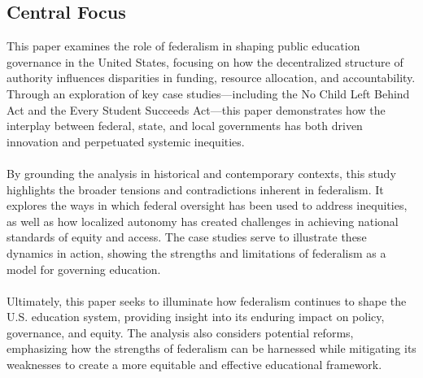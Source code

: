 \documentclass[11pt]{extarticle}
\begin{document}
\subsection{Central Focus}
This paper examines the role of federalism in shaping public education governance in the United States, focusing on how the decentralized structure of authority influences disparities in funding, resource allocation, and accountability. Through an exploration of key case studies—including the No Child Left Behind Act and the Every Student Succeeds Act—this paper demonstrates how the interplay between federal, state, and local governments has both driven innovation and perpetuated systemic inequities.\\
\\
By grounding the analysis in historical and contemporary contexts, this study highlights the broader tensions and contradictions inherent in federalism. It explores the ways in which federal oversight has been used to address inequities, as well as how localized autonomy has created challenges in achieving national standards of equity and access. The case studies serve to illustrate these dynamics in action, showing the strengths and limitations of federalism as a model for governing education.\\
\\
Ultimately, this paper seeks to illuminate how federalism continues to shape the U.S. education system, providing insight into its enduring impact on policy, governance, and equity. The analysis also considers potential reforms, emphasizing how the strengths of federalism can be harnessed while mitigating its weaknesses to create a more equitable and effective educational framework.




\section{}
\end{document}

